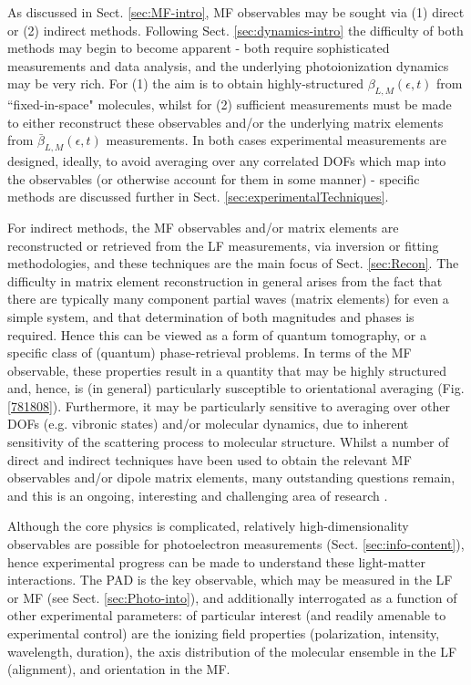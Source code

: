\documentclass[10pt]{article}
\begin{document}
As discussed in Sect. \ref{sec:MF-intro}, MF observables may be sought via (1) direct or (2) indirect methods. Following Sect. \ref{sec:dynamics-intro} the difficulty of both methods may begin to become apparent - both require sophisticated measurements and data analysis, and the underlying photoionization dynamics may be very rich. For (1) the aim is to obtain highly-structured $\beta_{L,M}(\epsilon,t)$ from ``fixed-in-space" molecules, whilst for (2) sufficient measurements must be made to either reconstruct these observables and/or the underlying matrix elements from $\bar{\beta}_{L,M}(\epsilon,t)$ measurements. In both cases experimental measurements are designed, ideally, to avoid averaging over any correlated DOFs which map into the observables (or otherwise account for them in some manner) - specific methods are discussed further in Sect. \ref{sec:experimentalTechniques}.

For indirect methods, the MF observables and/or matrix elements are reconstructed or retrieved from the LF measurements, via inversion or fitting methodologies, and these techniques are the main focus of Sect. \ref{sec:Recon}. The difficulty in matrix element reconstruction in general arises from the fact that there are typically many component partial waves (matrix elements) for even a simple system, and that determination of both magnitudes and phases is required. Hence this can be viewed as a form of quantum tomography, or a specific class of (quantum) phase-retrieval problems. In terms of the MF observable, these properties result in a quantity that may be highly structured and, hence, is (in general) particularly susceptible to orientational averaging (Fig. \ref{781808}). Furthermore, it may be particularly sensitive to averaging over other DOFs (e.g. vibronic states) and/or molecular dynamics, due to inherent sensitivity of the scattering process to molecular structure. Whilst a number of direct and indirect techniques have been used to obtain the relevant MF observables and/or dipole matrix elements, many outstanding questions remain, and this is an ongoing, interesting and challenging area of research \cite{hockett2018QMP1, hockett2018QMP2}.

Although the core physics is complicated, relatively high-dimensionality observables are possible for photoelectron measurements (Sect. \ref{sec:info-content}), hence experimental progress can be made to understand these light-matter interactions. The PAD is the key observable, which may be measured in the LF or MF (see Sect. \ref{sec:Photo-into}), and additionally interrogated as a function of other experimental parameters: of particular interest (and readily amenable to experimental control) are the ionizing field properties (polarization, intensity, wavelength, duration), the axis distribution of the molecular ensemble in the LF (alignment), and orientation in the MF. 
\end{document}

